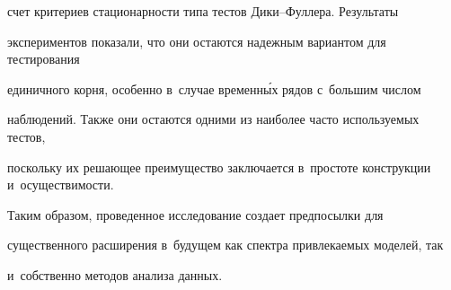 счет критериев стационарности типа тестов Ди\-ки--Фул\-ле\-ра. Результаты 


экспериментов показали, что они остаются надежным вариантом для тестирования 


единичного корня, особенно в~случае временн\'{ы}х рядов с~большим чис\-лом 


наблюдений. Также они остаются одними из наиболее час\-то ис\-поль\-зу\-емых тес\-тов, 


поскольку их решающее преимущество заключается в~прос\-то\-те конструкции и~осу\-щест\-ви\-мости. 


     


     Таким образом, проведенное исследование создает предпосылки для 


существенного расширения в~будущем как спект\-ра при\-вле\-ка\-емых моделей, так 


и~собственно методов анализа данных. 


     


